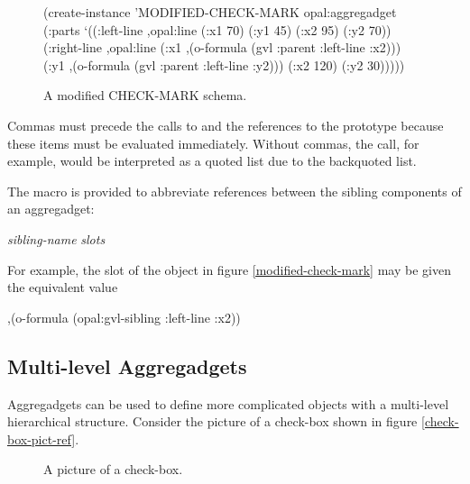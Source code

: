 \begin{figure}
\begin{programexample}
(create-instance 'MODIFIED-CHECK-MARK opal:aggregadget
   (:parts
    `((:left-line ,opal:line
                  (:x1 70)
                  (:y1 45)
                  (:x2 95)
                  (:y2 70))
      (:right-line ,opal:line
                   (:x1 ,(o-formula (gvl :parent :left-line :x2)))
                   (:y1 ,(o-formula (gvl :parent :left-line :y2)))
                   (:x2 120)
                   (:y2 30)))))
\end{programexample}
\caption{A modified CHECK-MARK schema.}
\end{figure}

Commas must precede the calls to  and the references to the
 prototype because these items must be evaluated
immediately.  Without commas,
the  call, for example, would
be interpreted as a quoted list due to the backquoted  list.

The macro  is provided to abbreviate references between
the sibling components of an aggregadget:

 {\it sibling-name}  {\it slots} \value{macro}

For example, the  slot of the  object in figure
\ref{modified-check-mark} may be
given the equivalent value
\begin{programexample}
,(o-formula (opal:gvl-sibling :left-line :x2))
\end{programexample}

\subsection{Multi-level Aggregadgets}

Aggregadgets can be used to define more complicated objects with a
multi-level hierarchical structure.  Consider the picture of a check-box
shown in figure \ref{check-box-pict-ref}.

\begin{figure}
\begin{center}
\end{center}
\caption{A picture of a check-box.}
\end{figure}


